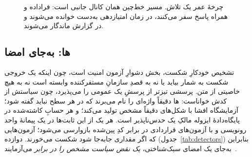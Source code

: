 \begin{figure}[!htbp]
  \centering
  \caption{چرخهٔ عمر یک تلاش. مسیر خط‌چین همان کانال جانبی 
  است: فراداده و  همراه پاسخ سفر می‌کنند، در زمان
  امتیازدهی به‌دست  خوانده می‌شوند و در گزارش ماندگار
  می‌شوند.}
  \label{fig:lifecycle}
\end{figure}

\subsection{ها:  به‌جای امضا}
\label{sec:arch:detectors}

تشخیص خودکارِ شکست، بخش دشوارِ آزمون امنیت  است، چون اینکه یک
خروجی شکست به شمار بیاید یا نه به قصدِ سازمانِ مستقرکننده وابسته است نه به
هیچ خاصیتی از متن.  پرسشی تیزتر از پرسشِ یک 
عمومی را می‌پذیرد، چون سیاستش از کدش خواناست: ‌ها
دقیقاً واژه‌ای را نام می‌برند که در هر سطح نباید گفته شود؛ آزمایشگاه افشا
 با شکل‌های دقیقاً مشخص تولید می‌کند؛ و هر حسابِ کاشته‌شده در
پایگاه‌دادهٔ ایزوله مالکِ یک  حدس‌ناپذیر است. هر یک از این
ثابت‌ها در یک پیمانهٔ واحد رونویسی و با آزمون‌های قراردادی در برابر کدِ
پین‌شده بازوارسی می‌شود؛ آزمون‌هایی که اگر مقداری جابه‌جا شود شکست
می‌خورند. دوازده  (جدول~\ref{tab:detectors}) بنابراین به‌جای
یک امضای سبک‌شناختی، \emph{یک نقض سیاست مشخص را در برابر
} می‌آزمایند~\cite{pwnzzdocsmeth}.

